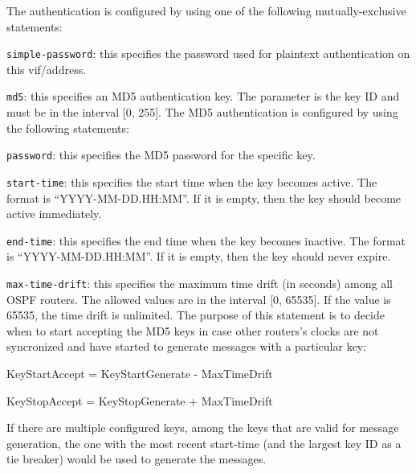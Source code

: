 \begin{description}
\begin{description}
\begin{description}
The authentication is configured by using one of the following
mutually-exclusive statements:

\begin{description}
\item{\tt simple-password}: this specifies the password used for
  plaintext authentication on this vif/address.
\item{\tt md5}: this specifies an MD5 authentication key. The parameter
  is the key ID and must be in the interval [0, 255].
  The MD5 authentication is configured by using the following
  statements:
\begin{description}
  \item{\tt password}: this specifies the MD5 password for the specific
  key.
  \item{\tt start-time}: this specifies the start time when the key
  becomes active. The format is ``YYYY-MM-DD.HH:MM''. If it is empty,
  then the key should become active immediately.
  \item{\tt end-time}: this specifies the end time when the key becomes
  inactive. The format is ``YYYY-MM-DD.HH:MM''. If it is empty,
  then the key should never expire.
  \item{\tt max-time-drift}: this specifies the maximum time drift
  (in seconds) among all OSPF routers.  The allowed values are in the
  interval [0, 65535]. If the value is 65535, the time drift is
  unlimited. The purpose of this statement is to decide when to start
  accepting the MD5 keys in case other routers's clocks are not
  syncronized and  have started to generate messages with a particular
  key:

\begin{description}
  \item KeyStartAccept = KeyStartGenerate - MaxTimeDrift
  \item KeyStopAccept  = KeyStopGenerate  + MaxTimeDrift
\end{description}

\end{description}

If there are multiple configured keys, among the keys that are valid
for message generation, the one with the most recent {\stt start-time}
(and the largest key ID as a tie breaker) would be used to generate the
messages.

\end{description}
\end{description}


\end{description}
\end{description}

